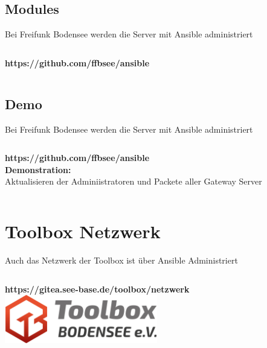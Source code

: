\documentclass[aspectratio=169]{beamer}
\begin{document}
\subsection{Modules} 
\begin{frame}{Bei Freifunk Bodensee werden die Server mit Ansible administriert}
    \begin{columns}
        \begin{column}{1.0\textwidth}
            \centering
            \textbf{https://github.com/ffbsee/ansible} \\
            
        \end{column}
    \end{columns}
\end{frame}

\subsection{Demo} 
\begin{frame}{Bei Freifunk Bodensee werden die Server mit Ansible administriert}
    \begin{columns}
        \begin{column}{1.0\textwidth}
            \centering
            \textbf{https://github.com/ffbsee/ansible} \\
            \vspace{0.8cm}
            \textbf{Demonstration:} \\
            Aktualisieren der Adminiistratoren und Packete aller Gateway Server \\
            
        \end{column}
    \end{columns}
\end{frame}

\section{Toolbox Netzwerk} 
\begin{frame}{Auch das Netzwerk der Toolbox ist über Ansible Administriert}
    \begin{columns}
        \begin{column}{1.0\textwidth}
            \centering
            \textbf{https://gitea.see-base.de/toolbox/netzwerk}
            \vspace{0.8cm}
            \includegraphics[width=0.5\textwidth]{toolbox_300dpi.jpg}
        \end{column}
    \end{columns}
\end{frame}
\end{document}
